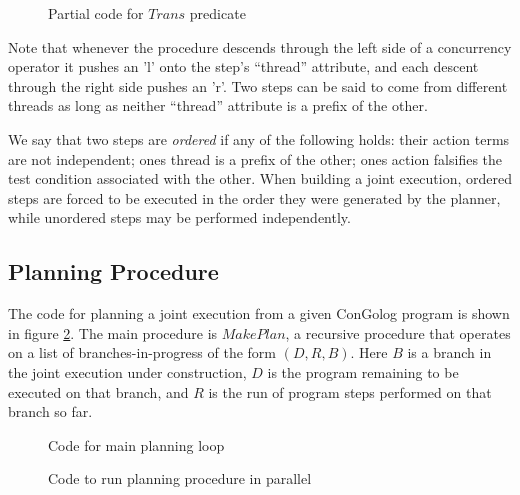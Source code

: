 %
\begin{figure}

\caption{ Partial code for $Trans$ predicate }


\label{fig:trans-code} 
\end{figure}


Note that whenever the procedure descends through the left side of
a concurrency operator it pushes an 'l' onto the step's {}``thread''
attribute, and each descent through the right side pushes an 'r'.
Two steps can be said to come from different threads as long as neither
{}``thread'' attribute is a prefix of the other.

We say that two steps are \emph{ordered} if any of the following holds:
their action terms are not independent; ones thread is a prefix of
the other; ones action falsifies the test condition associated with
the other. When building a joint execution, ordered steps are forced
to be executed in the order they were generated by the planner, while
unordered steps may be performed independently.


\subsection{Planning Procedure}

The code for planning a joint execution from a given ConGolog program
is shown in figure \ref{fig:planning-code}. The main procedure is
$MakePlan$, a recursive procedure that operates on a list of branches-in-progress
of the form $(D,R,B)$. Here $B$ is a branch in the joint execution
under construction, $D$ is the program remaining to be executed on
that branch, and $R$ is the run of program steps performed on that
branch so far.

%
\begin{figure}

\caption{ Code for main planning loop }


\label{fig:planning-code} 
\end{figure}


%
\begin{figure}

\caption{ Code to run planning procedure in parallel }


\label{fig:parallel-search} 
\end{figure}


